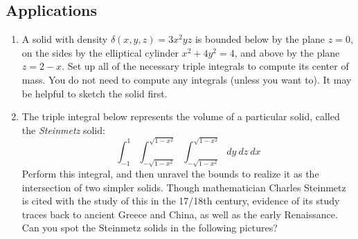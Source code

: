 \pagebreak

\subsection*{Applications}
\begin{enumerate}[resume]
    \item A solid with density $\delta(x, y, z) = 3x^2yz$ is bounded below
by the plane $z = 0$, on the sides by the elliptical cylinder
$x^2 + 4y^2 = 4$, and above by the plane $z = 2 − x$. Set up
all of the necessary triple integrals to compute its center
of mass. You do not need to compute any integrals (unless you want to). It may be helpful to sketch the solid first.

    \item The triple integral below represents the volume of a particular solid, called the \textit{Steinmetz} solid:
    \begin{equation*}
        \int_{-1}^1\int_{-\sqrt{1-x^2}}^{\sqrt{1-x^2}}\int_{-\sqrt{1-x^2}}^{\sqrt{1-x^2}}dy \ dz \ dx
    \end{equation*}
    Perform this integral, and then unravel the bounds to realize it as the intersection of two simpler solids. Though mathematician Charles Steinmetz is cited with the study of this in the 17/18th century, evidence of its study traces back to ancient Greece and China, as well as the early Renaissance. Can you spot the Steinmetz solids in the following pictures?


\end{enumerate}
